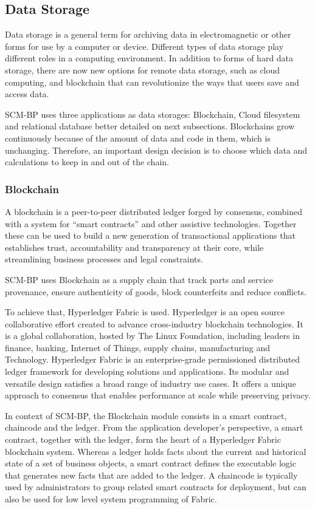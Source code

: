 \subsection{Data Storage}\label{sec:DataStorage}
Data storage is a general term for archiving data in electromagnetic or other forms for use by a computer or device. Different types of data storage play different roles in a computing environment. In addition to forms of hard data storage, there are now new options for remote data storage, such as cloud computing, and blockchain that can revolutionize the ways that users save and access data.  

SCM-BP uses three applications as data storages: Blockchain, Cloud filesystem and relational database better detailed on next subsections. Blockchains grow continuously because of the amount of data and code in them, which is unchanging. Therefore, an important design decision is to choose which data and calculations to keep in and out of the chain.

\subsubsection{Blockchain}\label{sec:DataStorageBlockchain}
A blockchain is a peer-to-peer distributed ledger forged by consensus, combined with a system for “smart contracts” and other assistive technologies. Together these can be used to build a new generation of transactional applications that establishes trust, accountability and transparency at their core, while streamlining business processes and legal constraints.

SCM-BP uses Blockchain as a supply chain that track parts and service provenance, ensure authenticity of goods, block counterfeits and reduce conflicts.

To achieve that, Hyperledger Fabric is used. Hyperledger is an open source collaborative effort created to advance cross-industry blockchain technologies. It is a global collaboration, hosted by The Linux Foundation, including leaders in finance, banking, Internet of Things, supply chains, manufacturing and Technology.
Hyperledger Fabric is an enterprise-grade permissioned distributed ledger framework for developing solutions and applications. Its modular and versatile design satisfies a broad range of industry use cases. It offers a unique approach to consensus that enables performance at scale while preserving privacy.

In context of SCM-BP, the Blockchain module consists in a smart contract, chaincode and the ledger. From the application developer’s perspective, a smart contract, together with the ledger, form the heart of a Hyperledger Fabric blockchain system. Whereas a ledger holds facts about the current and historical state of a set of business objects, a smart contract defines the executable logic that generates new facts that are added to the ledger. A chaincode is typically used by administrators to group related smart contracts for deployment, but can also be used for low level system programming of Fabric.

